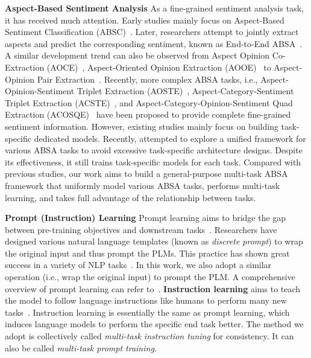 \documentclass[11pt]{article}
\begin{document}
\noindent\textbf{Aspect-Based Sentiment Analysis} \quad As a fine-grained sentiment analysis task, it has received much attention. Early studies mainly focus on Aspect-Based Sentiment Classification (ABSC)~\citep{dong-etal-2014-adarnn,wang-etal-2016-attention,tang2016effective,xue-li-2018-aspect}. Later, researchers attempt to jointly extract aspects and predict the corresponding sentiment, known as End-to-End ABSA~\citep{he-etal-2019-imn,DBLP:conf/aaai/LiBLL19,hu-etal-2019-open,chen-qian-2020-relation}. A similar development trend can also be observed from Aspect Opinion Co-Extraction (AOCE)~\citep{liu-etal-2015-fine,wang-etal-2016-recursive,DBLP:conf/aaai/WangPDX17}, Aspect-Oriented Opinion Extraction (AOOE)~\citep{fan-etal-2019-target,wu2020latent} to Aspect-Opinion Pair Extraction~\citep{chen-etal-2020-synchronous,zhao-etal-2020-spanmlt}. Recently, more complex ABSA tasks, i.e., Aspect-Opinion-Sentiment Triplet Extraction (AOSTE)~\citep{peng2020knowing,xu-etal-2020-position,wu2020grid,mao2021dualmrc,yan-etal-2021-unified,xu-etal-2021-learning,zhang-etal-2021-gas}, Aspect-Category-Sentiment Triplet Extraction (ACSTE)~\citep{wan2020tas}, and Aspect-Category-Opinion-Sentiment Quad Extraction (ACOSQE)~\citep{cai-etal-2021-acos,zhang-etal-2021-paraphrase} have been proposed to provide complete fine-grained sentiment information. However, existing studies mainly focus on building task-specific dedicated models. Recently, \citet{yan-etal-2021-unified} attempted to explore a unified framework for various ABSA tasks to avoid excessive task-specific architecture designs. Despite its effectiveness, it still trains task-specific models for each task. Compared with previous studies, our work aims to build a general-purpose multi-task ABSA framework that uniformly model various ABSA tasks, performs multi-task learning, and takes full advantage of the relationship between tasks.

\noindent\textbf{Prompt (Instruction) Learning} \quad Prompt learning aims to bridge the gap between pre-training objectives and downstream tasks~\citep{liu2021prompt-survey}. Researchers have designed various natural language templates (known as \emph{discrete prompt}) to wrap the original input and thus prompt the PLMs. This practice has shown great success in a variety of NLP tasks~\citep{DBLP:conf/nips/Brown20-GPT3,schick-schutze-2021-few-shot-generation,schick-schutze-2021-just,gao-etal-2021lm-bff,DBLP:journals/corr/abs-2109-04645-CINS,seoh-etal-2021-open}. In this work, we also adopt a similar operation (i.e., wrap the original input) to prompt the PLM. A comprehensive overview of prompt learning can refer to~\citet{liu2021prompt-survey}. \textbf{Instruction learning} aims to teach the model to follow language instructions like humans to perform many new tasks~\cite{DBLP:journals/corr/abs-2010-11982-turing-test,mishra-etal-2022-natural-instruction}. Instruction learning is essentially the same as prompt learning, which induces language models to perform the specific end task better. The method we adopt is collectively called \emph{multi-task instruction tuning} for consistency. It can also be called \emph{multi-task prompt training}.
\end{document}
